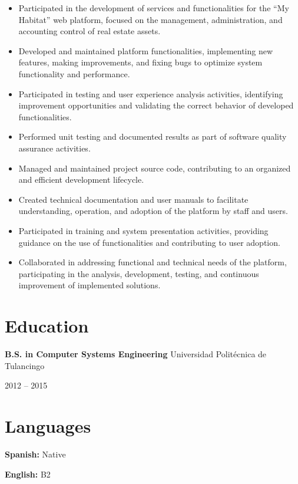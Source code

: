 \documentclass[10pt,letterpaper]{article}
\newcommand{\jobdate}[1]{
    {\color{MediumGray} #1}
}
\begin{document}
\begin{itemize}

    \item Participated in the development of services and functionalities for the ``My Habitat'' web platform, focused on the management, administration, and accounting control of real estate assets.

    \item Developed and maintained platform functionalities, implementing new features, making improvements, and fixing bugs to optimize system functionality and performance.

    \item Participated in testing and user experience analysis activities, identifying improvement opportunities and validating the correct behavior of developed functionalities.

    \item Performed unit testing and documented results as part of software quality assurance activities.

    \item Managed and maintained project source code, contributing to an organized and efficient development lifecycle.

    \item Created technical documentation and user manuals to facilitate understanding, operation, and adoption of the platform by staff and users.

    \item Participated in training and system presentation activities, providing guidance on the use of functionalities and contributing to user adoption.

    \item Collaborated in addressing functional and technical needs of the platform, participating in the analysis, development, testing, and continuous improvement of implemented solutions.

\end{itemize}


\section{Education}

\textbf{B.S. in Computer Systems Engineering} \textbar{}
Universidad Politécnica de Tulancingo
\hfill
\jobdate{2012 -- 2015}


\section{Languages}

\textbf{Spanish:} Native

\textbf{English:} B2
\end{document}
